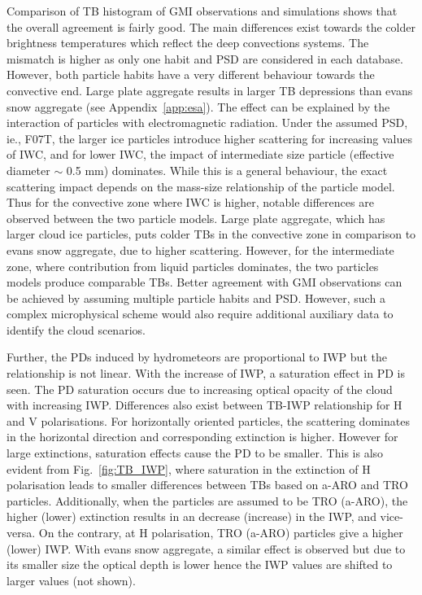 \documentclass[amt, manuscript]{copernicus}
\begin{document}
Comparison of TB histogram of GMI observations and simulations shows that the overall agreement is fairly good. The main differences exist towards the colder brightness temperatures which reflect the deep convections systems. The mismatch is higher as only one habit and PSD are considered in each database. However, both particle habits have a very different behaviour towards the convective end. Large plate aggregate results in larger TB depressions than evans snow aggregate (see Appendix~\ref{app:esa}). The effect can be explained by the interaction of particles with electromagnetic radiation. Under the assumed PSD, ie., F07T, the larger ice particles introduce higher scattering for increasing values of IWC, and for lower IWC, the impact of intermediate size particle (effective diameter $\sim$ 0.5\,\,mm) dominates. While this is a general behaviour, the exact scattering impact depends on the mass-size relationship of the particle model. Thus for the convective zone where IWC is higher, notable differences are observed between the two particle models. Large plate aggregate, which has larger cloud ice particles, puts colder TBs in the convective zone in comparison to evans snow aggregate, due to higher scattering. However, for the intermediate zone, where contribution from liquid particles dominates, the two particles models produce comparable TBs. Better agreement with GMI observations can be achieved by assuming multiple particle habits and PSD. However, such a complex microphysical scheme would also require additional auxiliary data to identify the cloud scenarios.  

Further, the PDs induced by hydrometeors are proportional to IWP but the relationship is not linear. With the increase of IWP, a saturation effect in PD is seen. The PD saturation occurs due to increasing optical opacity of the cloud with increasing IWP. Differences also exist between TB-IWP relationship for H and V polarisations. For horizontally oriented particles, the scattering dominates in the horizontal direction and corresponding extinction is higher. However for large extinctions, saturation effects cause the PD to be smaller. This is also evident from Fig.~\ref{fig:TB_IWP}, where saturation in the extinction of H  polarisation leads to smaller differences between TBs based on a-ARO and TRO particles. Additionally, when the particles are assumed to be TRO (a-ARO), the higher (lower) extinction results in an decrease (increase) in the IWP, and vice-versa. On the contrary, at H polarisation, TRO (a-ARO) particles give a higher (lower) IWP. With evans snow aggregate, a similar effect is observed but due to its smaller size the optical depth is lower hence the IWP values are shifted to larger values (not shown).
\end{document}
